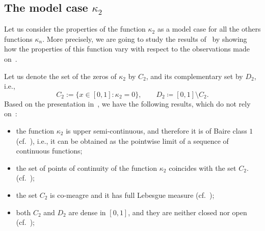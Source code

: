 \documentclass[12pt]{article}
\theoremstyle{plain}\newtheorem{teo}{Theorem}
\theoremstyle{plain}\newtheorem{proposition}[teo]{Proposition}
\theoremstyle{plain}\newtheorem{lemma}[teo]{Lemma}
\theoremstyle{plain}\newtheorem{corollary}[teo]{Corollary}
\theoremstyle{plain}\newtheorem{conjecture}[teo]{Conjecture}
\theoremstyle{definition}\newtheorem{definition}[teo]{Definition}
\theoremstyle{remark}\newtheorem{remark}[teo]{Remark}
\theoremstyle{definition}\newtheorem{example}[teo]{Example}
\numberwithin{teo}{section}
\numberwithin{equation}{section}
\begin{document}
\subsection{The model case $\kappa_2$}

Let us consider the properties of the 
function $\kappa_2$ as a model case for 
all the others functions $\kappa_n$.  More precisely, 
we are going to study the results of~\cite{Critical} by showing how the properties of this function vary with respect to the observations made on~\cite[Theorem 7]{Critical}.

Let us denote the set of the zeros of $\kappa_2$ by $C_2$,
and its complementary set by $D_2$, i.e.,
\[
C_2 := \big\{x \in [0,1]: \kappa_2 = 0\big\},
\qquad D_2 \coloneqq [0,1]\setminus C_2.
\]
Based on the presentation in~\cite{Critical},
we have the following results,
which do not rely on~\cite[Theorem 7]{Critical}:
\begin{itemize}
	\item the function $\kappa_2$ is upper semi-continuous,
		and therefore it is of Baire class $1$
		(cf.~\cite[Proposition 11]{Critical}),
		i.e., it can be obtained as the pointwise limit
		of a sequence of continuous functions;
	\item  the set of points of continuity of the function $\kappa_2$
		coincides with the set $C_2$.
		(cf.~\cite[Proposition 12]{Critical});
	\item the set $C_2$ is co-meagre  
		and it has full Lebesgue measure
		(cf.~\cite[Proposition 14]{Critical});
	\item both $C_2$ and $D_2$ are dense in $[0,1]$,
		and they are neither closed nor open
		(cf.~\cite[Proposition 15 and Proposition 16]{Critical});
\end{itemize}
\end{document}
